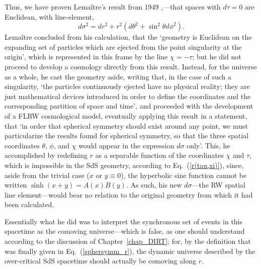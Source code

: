 Thus, we have proven Lema\^{i}tre's result from 1949 \cite{Lemaitre1949},---that spaces with $d\tau=0$ are Euclidean, with line-element,
\begin{equation}
d\sigma^2=dr^2+r^2\left(d\theta^2+\sin^2\theta{d\phi}^2\right).
\end{equation}
Lema\^{i}tre concluded from his calculation, that the `geometry is Euclidean on the expanding set of particles which are ejected from the point singularity at the origin', which is represented in this frame by the line $\chi=-\tau$; but he did not proceed to develop a cosmology directly from this result. Instead, for the universe as a whole, he cast the geometry aside, writing that, in the case of such a singularity, `the particles continuously ejected have no physical reality; they are just mathematical devices introduced in order to define the coordinates and the corresponding partition of space and time', and proceeded with the development of a FLRW cosmological model, eventually applying this result in a statement, that `in order that spherical symmetry should exist around any point, we must particularize the results found for spherical symmetry, so that the three spatial coordinates $\theta$, $\phi$, and $\chi$ would appear in the expression $d\sigma$ only'. This, he accomplished by redefining $r$ as a separable function of the coordinates $\chi$ and $\tau$, which is impossible in the SdS geometry, according to Eq.~(\ref{r(tau,xi)}), since, aside from the trivial case ($x$ or $y\equiv0$), the hyperbolic sine function cannot be written $\sinh(x+y)=A(x)B(y)$. As such, his new $d\sigma$---the RW spatial line element---would bear no relation to the original geometry from which it had been calculated.

Essentially what he did was to interpret the synchronous set of events in this spacetime as the comoving universe---which is false, as one should understand according to the discussion of Chapter~\ref{chap_DIRT}; for, by the definition that was finally given in Eq.~(\ref{sphersymm_r}), the dynamic universe described by the over-critical SdS spacetime should actually be comoving along $r$.

